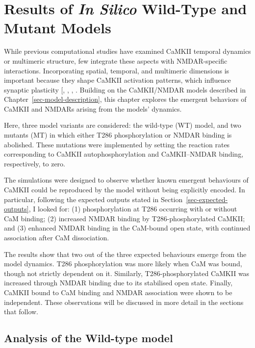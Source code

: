 \documentclass[
  11pt,
  letterpaper,
]{scrreprt}
\begin{document}
\chapter{\texorpdfstring{Results of \emph{In Silico} Wild-Type and
Mutant
Models}{Results of In Silico Wild-Type and Mutant Models}}\label{sec-results}

While previous computational studies have examined CaMKII temporal
dynamics or multimeric structure, few integrate these aspects with
NMDAR-specific interactions. Incorporating spatial, temporal, and
multimeric dimensions is important because they shape CaMKII activation
patterns, which influence synaptic plasticity
{[},
,
,
\citeproc{ref-ohno2002Pharmacogenetic}{208}{]}. Building on the
CaMKII/NMDAR models described in Chapter~\ref{sec-model-description},
this chapter explores the emergent behaviors of CaMKII and NMDARs
arising from the models' dynamics.

Here, three model variants are considered: the wild-type (WT) model, and
two mutants (MT) in which either T286 phosphorylation or NMDAR binding
is abolished. These mutations were implemented by setting the reaction
rates corresponding to CaMKII autophosphorylation and CaMKII--NMDAR
binding, respectively, to zero.

The simulations were designed to observe whether known emergent
behaviours of CaMKII could be reproduced by the model without being
explicitly encoded. In particular, following the expected outputs stated
in Section~\ref{sec-expected-outputs}, I looked for: (1) phosphorylation
at T286 occurring with or without CaM binding; (2) increased NMDAR
binding by T286-phosphorylated CaMKII; and (3) enhanced NMDAR binding in
the CaM-bound open state, with continued association after CaM
dissociation.

The results show that two out of the three expected behaviours emerge
from the model dynamics. T286 phosphorylation was more likely when CaM
was bound, though not strictly dependent on it. Similarly,
T286-phosphorylated CaMKII was increased through NMDAR binding due to
its stabilised open state. Finally, CaMKII bound to CaM binding and
NMDAR association were shown to be independent. These observations will
be discussed in more detail in the sections that follow.

\section{Analysis of the Wild-type
model}\label{analysis-of-the-wild-type-model}
\end{document}
